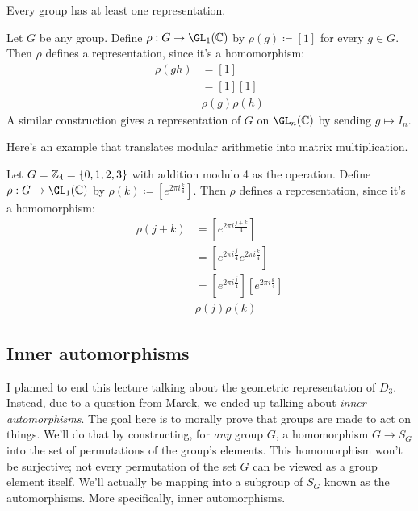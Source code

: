 Every group has at least one representation.

\begin{example}
    Let $G$ be any group.
    Define $\rho:G\to \GL_1(\C)$ by $\rho(g) \coloneq [1]$ for every $g\in G$.
    Then $\rho$ defines a representation, since it's a homomorphism:
    \begin{align*}
        \rho(gh) & = [1] \\
        & = [1][1] \\
        & \rho(g) \rho(h)
    \end{align*}
    A similar construction gives a representation of $G$ on $\GL_n(\C)$ by sending $g\mapsto I_n$.
\end{example}

Here's an example that translates modular arithmetic into matrix multiplication.

\begin{example}
    Let $G = \mathbb{Z}_4 = \{ 0,1,2,3 \}$ with addition modulo 4 as the operation.
    Define $\rho:G\to \GL_1(\C)$ by $\rho(k) \coloneq [e^{2\pi i \frac{k}{4}}]$.
    Then $\rho$ defines a representation, since it's a homomorphism:
    \begin{align*}
        \rho(j+k) & = [ e^{2\pi i \frac{j+k}{4}} ] \\
        & = [ e^{2\pi i \frac{j}{4}} e^{2\pi i \frac{k}{4}} ] \\
        & = [ e^{2\pi i \frac{j}{4}} ][ e^{2\pi i \frac{k}{4}} ] \\
        & \rho(j) \rho(k)
    \end{align*}
\end{example}



\subsection{Inner automorphisms}
I planned to end this lecture talking about the geometric representation of $D_3$.
Instead, due to a question from Marek, we ended up talking about {\it inner automorphisms}.
The goal here is to morally prove that groups are made to act on things.
We'll do that by constructing, for {\it any} group $G$, a homomorphism $G\to S_G$ into 
the set of permutations of the group's elements.
This homomorphism won't be surjective; not every permutation of the set $G$ can be viewed
as a group element itself.
We'll actually be mapping into a subgroup of $S_G$ known as the automorphisms.
More specifically, inner automorphisms.

